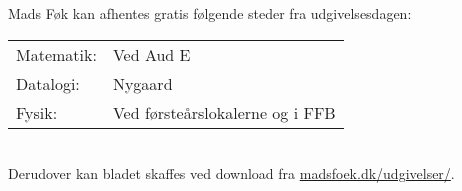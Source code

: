 \noindent Mads F{\o}k kan afhentes gratis f\o{}lgende steder fra 
udgivelsesdagen:\smallskip\\
\begin{tabular}{@{}ll@{}}
Matematik: & Ved Aud E\\
Datalogi:  & Nygaard\\
Fysik:     & Ved førsteårslokalerne og i FFB\\
\end{tabular}\smallskip\\
Derudover kan bladet skaffes ved download
fra \url{madsfoek.dk/udgivelser/}.

